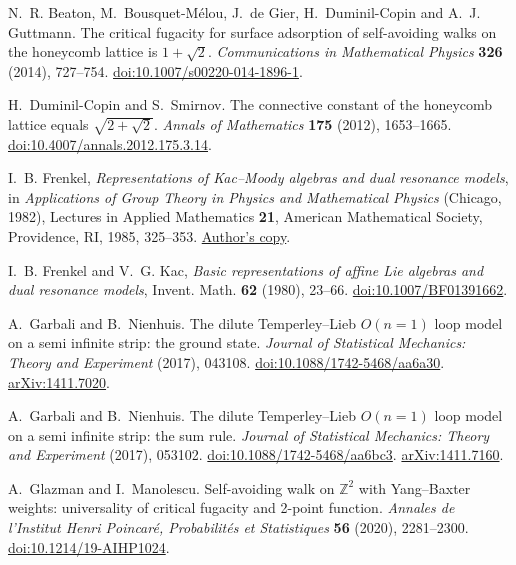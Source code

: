 N.~R. Beaton, M.~Bousquet-M\'elou, J.~de Gier, H.~Duminil-Copin and A.~J. Guttmann.
The critical fugacity for surface adsorption of self-avoiding walks on
the honeycomb lattice is $1+\sqrt2$.
\emph{Communications in Mathematical Physics} \textbf{326} (2014), 727--754.
\href{https://doi.org/10.1007/s00220-014-1896-1}{doi:10.1007/s00220-014-1896-1}.

H.~Duminil-Copin and S.~Smirnov.
The connective constant of the honeycomb lattice equals $\sqrt{2+\sqrt2}$.
\emph{Annals of Mathematics} \textbf{175} (2012), 1653--1665.
\href{https://doi.org/10.4007/annals.2012.175.3.14}{doi:10.4007/annals.2012.175.3.14}.

I.~B. Frenkel,
\emph{Representations of Kac--Moody algebras and dual resonance models},
in \emph{Applications of Group Theory in Physics and Mathematical Physics}
(Chicago, 1982), Lectures in Applied Mathematics \textbf{21},
American Mathematical Society, Providence, RI, 1985, 325--353.
\href{https://cpb-us-w2.wpmucdn.com/campuspress.yale.edu/dist/2/3739/files/2021/06/frenkel_representations_kac_moody.pdf}{Author's copy}.

I.~B. Frenkel and V.~G. Kac,
\emph{Basic representations of affine Lie algebras and dual resonance models},
Invent. Math. \textbf{62} (1980), 23--66.
\href{https://doi.org/10.1007/BF01391662}{doi:10.1007/BF01391662}.

A.~Garbali and B.~Nienhuis.
The dilute Temperley--Lieb $O(n=1)$ loop model on a semi infinite strip:
the ground state.
\emph{Journal of Statistical Mechanics: Theory and Experiment} (2017), 043108.
\href{https://doi.org/10.1088/1742-5468/aa6a30}{doi:10.1088/1742-5468/aa6a30}.
\href{https://arxiv.org/abs/1411.7020}{arXiv:1411.7020}.

A.~Garbali and B.~Nienhuis.
The dilute Temperley--Lieb $O(n=1)$ loop model on a semi infinite strip:
the sum rule.
\emph{Journal of Statistical Mechanics: Theory and Experiment} (2017), 053102.
\href{https://doi.org/10.1088/1742-5468/aa6bc3}{doi:10.1088/1742-5468/aa6bc3}.
\href{https://arxiv.org/abs/1411.7160}{arXiv:1411.7160}.

A.~Glazman and I.~Manolescu.
Self-avoiding walk on $\mathbb Z^2$ with Yang--Baxter weights:
universality of critical fugacity and 2-point function.
\emph{Annales de l'Institut Henri Poincar\'e, Probabilit\'es et Statistiques}
\textbf{56} (2020), 2281--2300.
\href{https://doi.org/10.1214/19-AIHP1024}{doi:10.1214/19-AIHP1024}.

